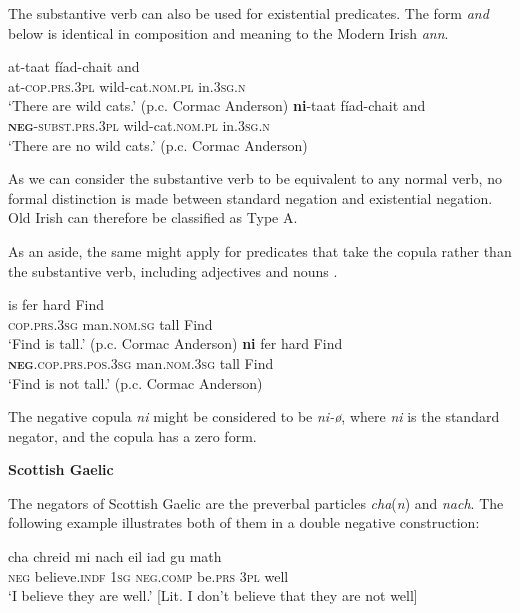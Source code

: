\documentclass[output=paper]{langsci/langscibook}
\begin{document}
\begin{unindented}
The substantive verb can also be used for existential predicates. The form \textit{and} below is identical in composition and meaning to the Modern Irish \textit{ann}. 
%
\begin{exe}\ex \gll at-taat fíad-chait and \\
at-\textsc{cop.prs.3pl} wild-cat.\textsc{nom.pl} in.\textsc{3sg.n} \\
    \glt `There are wild cats.' (p.c. Cormac Anderson)
\ex \gll \textbf{ni}-taat fíad-chait and \\
\textbf{\textsc{neg}}\textsc{-subst.prs.3pl} wild-cat.\textsc{nom.pl} in.\textsc{3sg.n} \\
    \glt `There are no wild cats.' (p.c. Cormac Anderson)
    \end{exe}

As we can consider the substantive verb to be equivalent to any normal verb, no formal distinction is made between standard negation and existential negation. Old Irish can therefore be classified as Type A.

As an aside, the same might apply for predicates that take the copula rather than the substantive verb, including adjectives and nouns \citep[39]{McCone2005}.
%
\begin{exe}\ex \gll is fer hard Find \\
\textsc{cop.prs.3sg} man.\textsc{nom.sg} tall   Find \\
    \glt `Find is tall.' (p.c. Cormac Anderson)
\ex \gll \textbf{ni} fer hard Find \\
\textbf{\textsc{neg}}\textsc{.cop.prs.pos.3sg} man.\textsc{nom.3sg} tall   Find \\
    \glt `Find is not tall.' (p.c. Cormac Anderson)
    \end{exe}

The negative copula \textit{ni} might be considered to be \textit{ni-ø}, where \textit{ni} is the standard negator, and the copula has a zero form. 

\textbf{Scottish Gaelic}

The negators of Scottish Gaelic are the preverbal particles
\textit{cha}(\textit{n}) and \textit{nach}. The following example illustrates both of them in a double negative construction:
%
\begin{exe}\ex \gll cha chreid mi  nach eil iad {gu math} \\
\textsc{neg} believe.\textsc{indf} \textsc{1sg} \textsc{neg.comp} be.\textsc{prs} \textsc{3pl} well \\
    \glt `I believe they are well.' [Lit. I don’t believe that they are not well] \citep[61]{Lamb2001}
    \end{exe}


\end{unindented}
\end{document}
